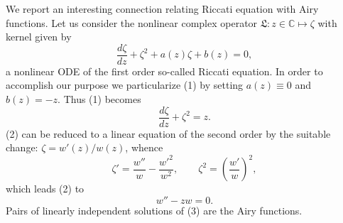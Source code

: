 \documentclass[12pt]{article}
\begin{document}
We report an interesting connection relating Riccati equation with Airy functions. Let us consider the nonlinear complex operator $\mathfrak{L}:z\in\mathbb{C}\mapsto\zeta$ with kernel given by
\begin{equation}
\frac{d\zeta}{dz}+\zeta^2+a(z)\zeta+b(z)=0,
\end{equation}
a nonlinear ODE of the first order so-called Riccati equation. In order to accomplish our purpose we particularize (1) by setting $a(z)\equiv 0$ and $b(z)=-z$. Thus (1) becomes
\begin{equation}
\frac{d\zeta}{dz}+\zeta^2=z.
\end{equation}
(2) can be reduced to a linear equation of the second order by the suitable change: $\zeta=w'(z)/w(z)$, whence
\begin{equation*} 
\zeta'=\frac{w''}{w}-\frac{w'^2}{w^2}, \qquad \zeta^2=\left(\frac{w'}{w}\right)^2,
\end{equation*}
which leads (2) to
\begin{equation}
w''-zw=0.
\end{equation}
Pairs of linearly independent solutions of (3) are the Airy functions.
  

\end{document}
